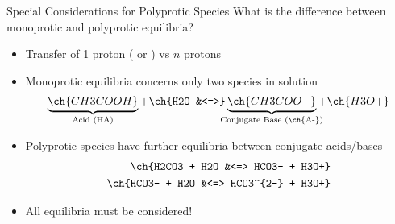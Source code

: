\documentclass[handout]{beamer}
\begin{document}


\begin{frame}{Special Considerations for Polyprotic Species}
	What is the difference between monoprotic and polyprotic equilibria?
	\begin{itemize}[<+->]
		\item Transfer of 1 proton ( or ) vs $n$ protons
		\item Monoprotic equilibria concerns only \alert{two} species in
			solution
			\begin{align*}
				\underbrace{\ch{CH3COOH}}_{\mathclap{\text{Acid
				(HA)}}} +
				\ch{H2O &<=>}
				\underbrace{\ch{CH3COO-}}_{\mathclap{\text{Conjugate
				Base (\ch{A-})}}} + \ch{H3O+}
			\end{align*}
		\item Polyprotic species have \alert{further equilibria} between
			conjugate acids/bases
			\begin{align*}
				\ch{H2CO3 + H2O &<=> HCO3- + H3O+} \\
				\ch{HCO3- + H2O &<=> HCO3^{2-} + H3O+}
			\end{align*}
		\item \alert{All} equilibria must be considered!
	\end{itemize}
\end{frame}
\end{document}
